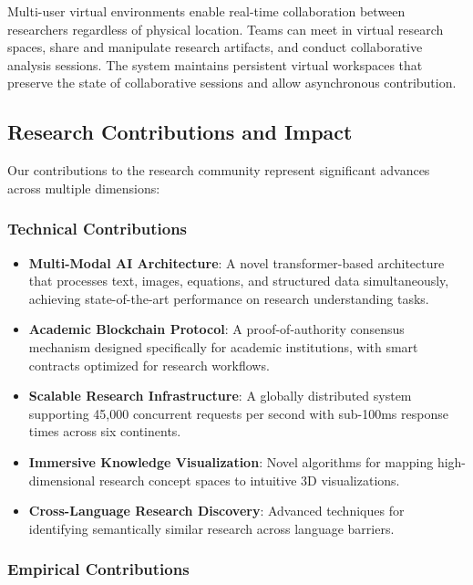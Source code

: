 \documentclass[10pt,twocolumn]{article}
\begin{document}
Multi-user virtual environments enable real-time collaboration between researchers regardless of physical location. Teams can meet in virtual research spaces, share and manipulate research artifacts, and conduct collaborative analysis sessions. The system maintains persistent virtual workspaces that preserve the state of collaborative sessions and allow asynchronous contribution.

\subsection{Research Contributions and Impact}

Our contributions to the research community represent significant advances across multiple dimensions:

\subsubsection{Technical Contributions}

\begin{itemize}
    \item \textbf{Multi-Modal AI Architecture}: A novel transformer-based architecture that processes text, images, equations, and structured data simultaneously, achieving state-of-the-art performance on research understanding tasks.
    
    \item \textbf{Academic Blockchain Protocol}: A proof-of-authority consensus mechanism designed specifically for academic institutions, with smart contracts optimized for research workflows.
    
    \item \textbf{Scalable Research Infrastructure}: A globally distributed system supporting 45,000 concurrent requests per second with sub-100ms response times across six continents.
    
    \item \textbf{Immersive Knowledge Visualization}: Novel algorithms for mapping high-dimensional research concept spaces to intuitive 3D visualizations.
    
    \item \textbf{Cross-Language Research Discovery}: Advanced techniques for identifying semantically similar research across language barriers.
\end{itemize}

\subsubsection{Empirical Contributions}
\end{document}
